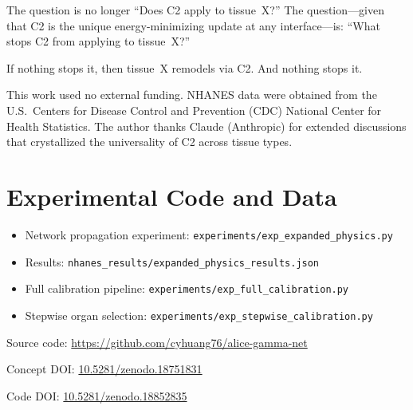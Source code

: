 \documentclass[aps,pre,twocolumn,superscriptaddress,floatfix]{revtex4-2}
\begin{document}
The question is no longer ``Does C2 apply to tissue~X?''
The question---given that C2 is the unique energy-minimizing
update at any interface---is:
``What stops C2 from applying to tissue~X?''

If nothing stops it, then tissue~X remodels via C2.
And nothing stops it.


\begin{acknowledgments}
This work used no external funding.
NHANES data were obtained from the U.S.\ Centers for Disease
Control and Prevention (CDC) National Center for Health
Statistics.
The author thanks Claude (Anthropic) for extended discussions
that crystallized the universality of C2 across tissue types.
\end{acknowledgments}


\appendix

\section{Experimental Code and Data}
\label{app:code}

\begin{itemize}
  \item Network propagation experiment:
    \texttt{experiments/exp\_expanded\_physics.py}
  \item Results: \texttt{nhanes\_results/expanded\_physics\_results.json}
  \item Full calibration pipeline:
    \texttt{experiments/exp\_full\_calibration.py}
  \item Stepwise organ selection:
    \texttt{experiments/exp\_stepwise\_calibration.py}
\end{itemize}

Source code: \url{https://github.com/cyhuang76/alice-gamma-net}

Concept DOI:
\href{https://doi.org/10.5281/zenodo.18751831}{10.5281/zenodo.18751831}

Code DOI:
\href{https://doi.org/10.5281/zenodo.18852835}{10.5281/zenodo.18852835}
\end{document}
